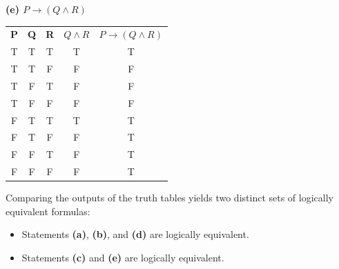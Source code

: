 \documentclass[12pt]{exam}
\begin{document}
\noindent\textbf{(e) $P \rightarrow (Q \land R)$}
\begin{table}[h]
    \centering 
    \begin{tabular}{ccccc}
        \textbf{P} & \textbf{Q} & \textbf{R} & \textbf{$Q \land R$} & \textbf{$P \rightarrow (Q \land R)$} \\
        T & T & T & T & T \\
        T & T & F & F & F \\
        T & F & T & F & F \\
        T & F & F & F & F \\
        F & T & T & T & T \\
        F & T & F & F & T \\
        F & F & T & F & T \\
        F & F & F & F & T \\
    \end{tabular}
\end{table}

Comparing the outputs of the truth tables yields two distinct sets of logically equivalent formulas:
\begin{itemize}
    \item  Statements \textbf{(a)}, \textbf{(b)}, and \textbf{(d)} are logically equivalent.
    \item  Statements \textbf{(c)} and \textbf{(e)} are logically equivalent.
\end{itemize}
\end{document}
